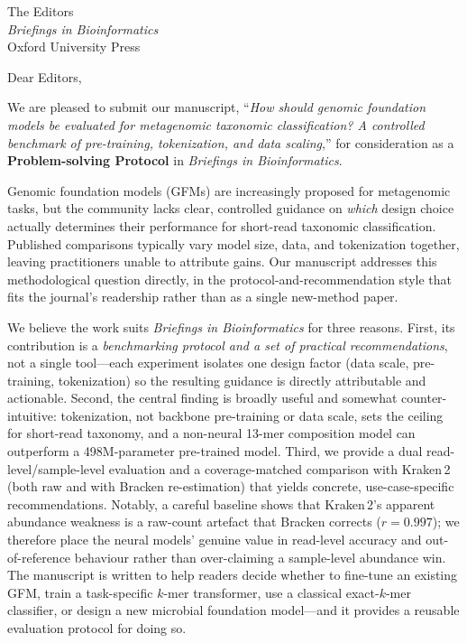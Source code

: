 \documentclass[11pt]{letter}
\begin{document}
\begin{letter}{The Editors\\ \emph{Briefings in Bioinformatics}\\ Oxford University Press}
\opening{Dear Editors,}

We are pleased to submit our manuscript, ``\emph{How should genomic foundation
models be evaluated for metagenomic taxonomic classification? A controlled
benchmark of pre-training, tokenization, and data scaling},'' for consideration
as a \textbf{Problem-solving Protocol} in \emph{Briefings in Bioinformatics}.

Genomic foundation models (GFMs) are increasingly proposed for metagenomic
tasks, but the community lacks clear, controlled guidance on \emph{which} design
choice actually determines their performance for short-read taxonomic
classification. Published comparisons typically vary model size, data, and
tokenization together, leaving practitioners unable to attribute gains. Our
manuscript addresses this methodological question directly, in the
protocol-and-recommendation style that fits the journal's readership rather than
as a single new-method paper.

We believe the work suits \emph{Briefings in Bioinformatics} for three reasons.
First, its contribution is a \emph{benchmarking protocol and a set of practical
recommendations}, not a single tool---each experiment isolates one design factor
(data scale, pre-training, tokenization) so the resulting guidance is directly
attributable and actionable. Second, the central finding is broadly useful and
somewhat counter-intuitive: tokenization, not backbone pre-training or data
scale, sets the ceiling for short-read taxonomy, and a non-neural 13-mer
composition model can outperform a 498M-parameter pre-trained model. Third, we
provide a dual read-level/sample-level evaluation and a coverage-matched
comparison with Kraken\,2 (both raw and with Bracken re-estimation) that yields
concrete, use-case-specific recommendations. Notably, a careful baseline shows
that Kraken\,2's apparent abundance weakness is a raw-count artefact that Bracken
corrects ($r=0.997$); we therefore place the neural models' genuine value in
read-level accuracy and out-of-reference behaviour rather than over-claiming a
sample-level abundance win. The manuscript is written to help readers decide whether to fine-tune
an existing GFM, train a task-specific $k$-mer transformer, use a classical
exact-$k$-mer classifier, or design a new microbial foundation model---and it
provides a reusable evaluation protocol for doing so.


\end{letter}
\end{document}
